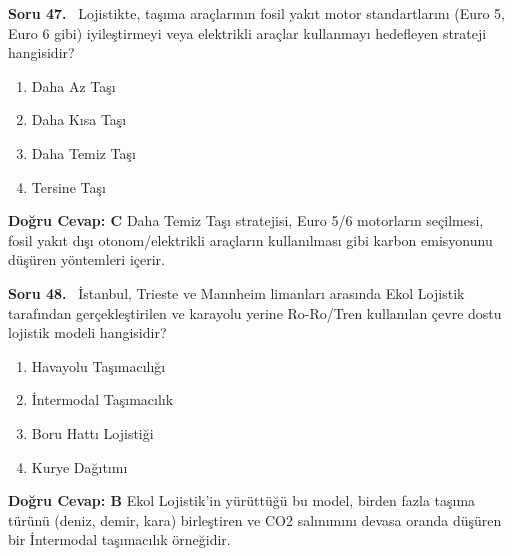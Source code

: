 \documentclass[11pt,a4paper,openany]{book}
\begin{document}
\needspace{5cm}
\vspace{8pt}
\noindent\textbf{\large\sffamily Soru 47.} \ Lojistikte, taşıma araçlarının fosil yakıt motor standartlarını (Euro 5, Euro 6 gibi) iyileştirmeyi veya elektrikli araçlar kullanmayı hedefleyen strateji hangisidir?
\begin{enumerate}[label=\Alph*), leftmargin=25pt, topsep=4pt, itemsep=2pt]
    \item Daha Az Taşı
    \item Daha Kısa Taşı
    \item Daha Temiz Taşı
    \item Tersine Taşı
\end{enumerate}
\vspace{4pt}
\begin{tcolorbox}[title=Cevap ve Açıklama, colback=gray!3!white, colframe=primarycolor!90!black, arc=2mm, fonttitle=\bfseries\sffamily, top=6pt, bottom=6pt]
    \textbf{Doğru Cevap: C}
    \vspace{2pt}
    Daha Temiz Taşı stratejisi, Euro 5/6 motorların seçilmesi, fosil yakıt dışı otonom/elektrikli araçların kullanılması gibi karbon emisyonunu düşüren yöntemleri içerir.
\end{tcolorbox}
\vspace{10pt}

\needspace{5cm}
\vspace{8pt}
\noindent\textbf{\large\sffamily Soru 48.} \ İstanbul, Trieste ve Mannheim limanları arasında Ekol Lojistik tarafından gerçekleştirilen ve karayolu yerine Ro-Ro/Tren kullanılan çevre dostu lojistik modeli hangisidir?
\begin{enumerate}[label=\Alph*), leftmargin=25pt, topsep=4pt, itemsep=2pt]
    \item Havayolu Taşımacılığı
    \item İntermodal Taşımacılık
    \item Boru Hattı Lojistiği
    \item Kurye Dağıtımı
\end{enumerate}
\vspace{4pt}
\begin{tcolorbox}[title=Cevap ve Açıklama, colback=gray!3!white, colframe=primarycolor!90!black, arc=2mm, fonttitle=\bfseries\sffamily, top=6pt, bottom=6pt]
    \textbf{Doğru Cevap: B}
    \vspace{2pt}
    Ekol Lojistik'in yürüttüğü bu model, birden fazla taşıma türünü (deniz, demir, kara) birleştiren ve CO2 salınımını devasa oranda düşüren bir İntermodal taşımacılık örneğidir.
\end{tcolorbox}
\vspace{10pt}
\end{document}
